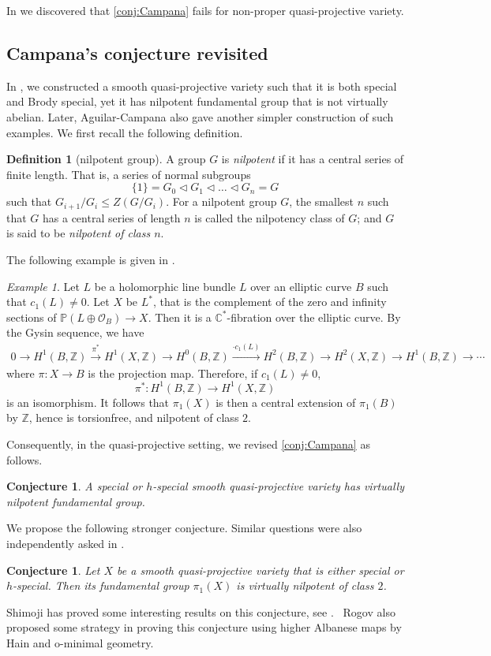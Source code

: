 \documentclass[english]{amsproc}
\theoremstyle{plain}
\newtheorem{conjecture}[thm]{Conjecture}
\theoremstyle{definition}
\newtheorem{dfn}[thm]{Definition}
\theoremstyle{remark}
\newtheorem{example}[thm]{Example}
\theoremstyle{plain}
\numberwithin{equation}{thm} %
\newcommand{\cO}{\mathcal O}
\newcommand{\bC}{\mathbb{C}}
\newcommand{\bP}{\mathbb{P}}
\newcommand{\bZ}{\mathbb{Z}}
\begin{document}
	
	In \cite{CDY25b} we discovered that  \cref{conj:Campana} fails for non-proper  quasi-projective variety. 
	
	\subsection{Campana's conjecture revisited}
	In \cite[Example 4.26]{CDY25b}, we constructed a smooth quasi-projective variety  such that it is both special and Brody special, yet it has nilpotent fundamental group that is not virtually abelian.  Later, Aguilar-Campana \cite{AC25}  also gave another simpler construction of such examples.   
	We first recall the following definition. 
	\begin{dfn}[nilpotent group]
		A group $G$ is \emph{nilpotent} if it  has a  central series of finite length. That is, a series of normal subgroups
		$$\{1\} = G_0 \triangleleft G_1 \triangleleft \dots \triangleleft G_n = G$$
		such that $G_{i+1}/G_i\leq Z(G/G_i)$.  For a nilpotent group $G$, the smallest $n$ such that $G$ has a central series of length $n$ is called the nilpotency class of $ G$; and $G$ is said to be \emph{nilpotent of class $n$}. 
	\end{dfn}  
	The following example is given in \cite{AC25}. 
	\begin{example}\label{example}
		Let $L$ be a  holomorphic line bundle $L$ over an elliptic curve $B$   such that $c_1(L)\neq 0$.  Let $X$ be $L^*$, that is the complement  of the zero
		and infinity sections of  $\bP(L\oplus \cO_B)\to X$. Then it is a $\bC^*$-fibration over the elliptic curve.  
		By the Gysin sequence, we have 
		\begin{align}\label{eq:Gysin}
			0\to H^1(B,\bZ)\stackrel{\pi^*}{\to} H^1(X,\bZ)\to H^0(B,\bZ)\stackrel{\cdot c_1(L)}{\to} H^2(B,\bZ)\to H^2(X,\bZ)\to H^1(B,\bZ)\to\cdots
		\end{align}   
		where $\pi:X\to B$ is the projection map.   Therefore, if $c_1(L)\neq 0$,  
		$$
		\pi^*: H^1(B,\bZ) {\to} H^1(X,\bZ)
		$$
		is an isomorphism.   It follows that $\pi_1(X)$ is then
		a central extension of $\pi_1(B)$ by $\bZ$,  hence is  torsionfree, and  nilpotent of class $2$. 
	\end{example} 
	Consequently, in the quasi-projective setting, we revised \cref{conj:Campana} as follows.
	\begin{conjecture}\label{conj:Campana2}
		A special or $h$-special smooth quasi-projective variety has virtually nilpotent fundamental group.  
	\end{conjecture} 
	We propose the following stronger conjecture. Similar questions were also independently asked in \cite{AC25, Rogov25}. 
	\begin{conjecture}\label{conj:Campana3}
		Let $X$ be a smooth quasi-projective variety that is either  {special} or  {$h$-special}. Then its fundamental group $\pi_1(X)$ is  {virtually nilpotent of class $2$}.
	\end{conjecture} 
	Shimoji has proved some interesting results on  this conjecture, see \cite{Taito25}.  Rogov \cite{Rogov25} also proposed some strategy in proving this conjecture using higher Albanese maps by Hain and o-minimal geometry. 
\end{document}
